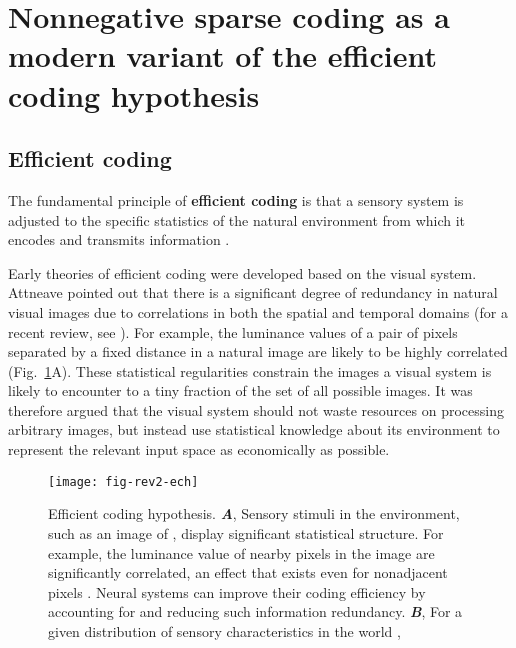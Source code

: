 \section*{Nonnegative sparse coding as a modern variant of the efficient coding hypothesis}

\subsection*{Efficient coding}

The fundamental principle of \textbf{efficient coding}
is that a sensory system is
adjusted to the specific statistics of the natural environment from which
it encodes and transmits information
\cite{Barlow1961,Attneave1954,Linsker1990,LouieGlimcher2012}.

Early theories of efficient coding
\cite{Barlow1961,Attneave1954}
were developed based on the visual system.
Attneave \cite{Attneave1954} pointed out that there is a significant
degree of redundancy in natural visual images due to correlations in both
the spatial and temporal domains
(for a recent review, see \cite{SimoncelliOlshausen2001}).
For example, the luminance values of a pair of pixels
separated by a fixed distance in a natural image
are likely to be highly correlated
(Fig.~\ref{fig:ech}A).
These statistical regularities constrain the images a visual system
is likely to encounter to a tiny fraction of the set of all
possible images.
It was therefore argued that the visual system should not
waste resources on processing arbitrary images,
but instead use statistical knowledge
about its environment to represent the relevant input space 
as economically as possible.


\begin{figure}[h]
	\centering
	\texttt{[image: fig-rev2-ech]}
    \caption{Efficient coding hypothesis.
    \textbf{\emph{A}},
         Sensory stimuli in the environment, such as an image of ,
         display significant statistical structure. For example, the luminance
         value of nearby pixels in the image are significantly correlated,
         an effect that exists even for nonadjacent pixels .
         Neural systems can improve their coding efficiency by accounting
         for and reducing such information redundancy.
     \textbf{\emph{B}},
         For a given distribution of sensory characteristics in the world ,
    }
	\label{fig:ech}
\end{figure}


